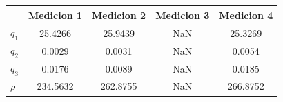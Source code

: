 \documentclass[border=6pt]{standalone}
\begin{document}
\begin{tabular}{|>{\bfseries}l|c|c|c|c|}
    \hline
    \rowcolor{headerblue}
    \color{headertext}          &
    \color{headertext}\textbf{Medicion 1} &
    \color{headertext}\textbf{Medicion 2} &
    \color{headertext}\textbf{Medicion 3} &
    \color{headertext}\textbf{Medicion 4} \\
    \hline
    \rowcolor{rowlight}
    $q_1$  &   25.4266 & 25.9439 &     NaN & 25.3269  \\
    \hline
    \rowcolor{rowwhite}
    $q_2$  &    0.0029 &  0.0031 &     NaN &  0.0054 \\
    \hline
    \rowcolor{rowlight}
    $q_3$  &    0.0176 &  0.0089 &     NaN &  0.0185 \\
    \hline
    \rowcolor{rowwhite}
    $\rho$ &  234.5632 &262.8755 &     NaN &266.8752 \\
    \hline
\end{tabular}
\end{document}
